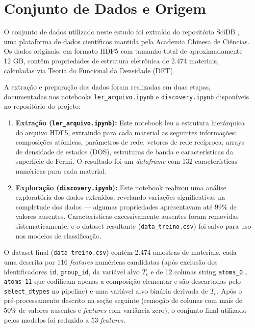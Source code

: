 \documentclass[12pt, a4paper, oneside]{report}
\begin{document}
\section{Conjunto de Dados e Origem}
\label{sec:dataset}

O conjunto de dados utilizado neste estudo foi extraído do repositório SciDB \cite{scidb2024}, uma plataforma de dados científicos mantida pela Academia Chinesa de Ciências. Os dados originais, em formato HDF5 com tamanho total de aproximadamente 12 GB, contêm propriedades de estrutura eletrônica de 2.474 materiais, calculadas via Teoria do Funcional da Densidade (DFT).

A extração e preparação dos dados foram realizadas em duas etapas, documentadas nos notebooks \texttt{ler\_arquivo.ipynb} e \texttt{discovery.ipynb} disponíveis no repositório do projeto:

\begin{enumerate}
    \item \textbf{Extração (\texttt{ler\_arquivo.ipynb}):} Este notebook leu a estrutura hierárquica do arquivo HDF5, extraindo para cada material as seguintes informações: composições atômicas, parâmetros de rede, vetores de rede recíproca, arrays de densidade de estados (DOS), estruturas de banda e características da superfície de Fermi. O resultado foi um \textit{dataframe} com 132 características numéricas para cada material.
    
    \item \textbf{Exploração (\texttt{discovery.ipynb}):} Este notebook realizou uma análise exploratória dos dados extraídos, revelando variações significativas na completude dos dados --- algumas propriedades apresentavam até 99\% de valores ausentes. Características excessivamente ausentes foram removidas sistematicamente, e o dataset resultante (\texttt{data\_treino.csv}) foi salvo para uso nos modelos de classificação.
\end{enumerate}

O dataset final (\texttt{data\_treino.csv}) contém 2.474 amostras de materiais, cada uma descrita por 116 \textit{features} numéricas candidatas (após exclusão dos identificadores \texttt{id}, \texttt{group\_id}, da variável alvo $T_c$ e de 12 colunas string \texttt{atoms\_0}\ldots\texttt{atoms\_11} que codificam apenas a composição elementar e são descartadas pelo \texttt{select\_dtypes} no pipeline) e uma variável alvo binária derivada de $T_c$. Após o pré-processamento descrito na seção seguinte (remoção de colunas com mais de 50\% de valores ausentes e \textit{features} com variância zero), o conjunto final utilizado pelos modelos foi reduzido a 53 \textit{features}.
\end{document}
